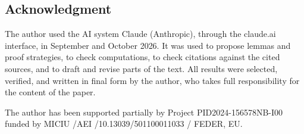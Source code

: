 \documentclass [leqno, 10pt]{amsart}
\def\MR#1{}
\theoremstyle{definition}
\numberwithin{equation}{section}
\begin{document}
\subsection*{Acknowledgment}
The author used the AI system Claude (Anthropic), through the claude.ai interface, in September and October 2026. It was used to propose lemmas and proof strategies, to check computations, to check citations against the cited sources, and to draft and revise parts of the text. All results were selected, verified, and written in final form by the author, who takes full responsibility for the content of the paper.

The author has been supported partially by Project PID2024-156578NB-I00 funded by MICIU /AEI /10.13039/501100011033 / FEDER, EU.


\def\polhk#1{\setbox0=\hbox{#1}{\ooalign{\hidewidth
  \lower1.5ex\hbox{`}\hidewidth\crcr\unhbox0}}} \def\cprime{$'$}
  \def\cprime{$'$} \def\cprime{$'$}
  \def\polhk#1{\setbox0=\hbox{#1}{\ooalign{\hidewidth
  \lower1.5ex\hbox{`}\hidewidth\crcr\unhbox0}}} \def\cprime{$'$}
  \def\cprime{$'$} \def\cprime{$'$} \def\cprime{$'$}
  \def\polhk#1{\setbox0=\hbox{#1}{\ooalign{\hidewidth
  \lower1.5ex\hbox{`}\hidewidth\crcr\unhbox0}}} \def\cprime{$'$}
  \def\Dbar{\leavevmode\lower.6ex\hbox to 0pt{\hskip-.23ex \accent"16\hss}D}
  \def\cprime{$'$} \def\cprime{$'$} \def\cprime{$'$} \def\cprime{$'$}
  \def\cprime{$'$} \def\cprime{$'$} \def\cprime{$'$} \def\cprime{$'$}
  \def\cprime{$'$} \def\cprime{$'$} \def\cprime{$'$} \def\dbar{\leavevmode\hbox
  to 0pt{\hskip.2ex \accent"16\hss}d} \def\cprime{$'$} \def\cprime{$'$}
  \def\cprime{$'$} \def\cprime{$'$} \def\cprime{$'$} \def\cprime{$'$}
  \def\cprime{$'$} \def\cprime{$'$} \def\cprime{$'$} \def\cprime{$'$}
  \def\cprime{$'$} \def\cprime{$'$} \def\cprime{$'$} \def\cprime{$'$}
  \def\cprime{$'$} \def\cprime{$'$} \def\cprime{$'$} \def\cprime{$'$}
  \def\cprime{$'$} \def\cprime{$'$} \def\cprime{$'$} \def\cprime{$'$}
  \def\cprime{$'$} \def\cprime{$'$} \def\cprime{$'$} \def\cprime{$'$}
  \def\cprime{$'$} \def\cprime{$'$} \def\cprime{$'$} \def\cprime{$'$}
  \def\cprime{$'$} \def\cprime{$'$}
\providecommand{\bysame}{\leavevmode\hbox to3em{\hrulefill}\thinspace}
\providecommand{\MR}{\relax\ifhmode\unskip\space\fi MR }
\providecommand{\MRhref}[2]{%
  \href{http://www.ams.org/mathscinet-getitem?mr=#1}{#2}
}
\providecommand{\href}[2]{#2}
\end{document}
